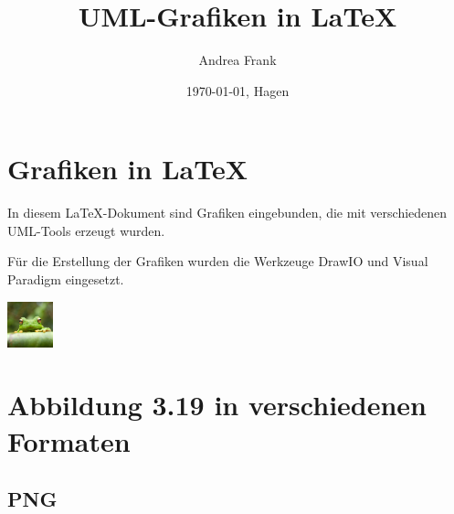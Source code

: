 \documentclass[11pt]{scrartcl}
\title{UML-Grafiken in \LaTeX}
\author{Andrea Frank}
\date{\today{}, Hagen}
\begin{document}
\maketitle

\newpage

\tableofcontents

\newpage

\section{Grafiken in \LaTeX}

In diesem \LaTeX-Dokument sind Grafiken eingebunden, die mit  verschiedenen UML-Tools erzeugt wurden.

Für die Erstellung der Grafiken wurden die Werkzeuge DrawIO und Visual Paradigm eingesetzt. 

\begin{center}
    \includegraphics[width=0.1\textwidth]{frog}
\end{center}

\newpage

\section{Abbildung 3.19 in verschiedenen Formaten}

\subsection{PNG}
\begin{figure}[htbp]
   \centering
   \setlength{\fboxsep}{5pt}
   \setlength{\fboxrule}{2pt}
   \label{fig:Abb-3-19-png}
\end{figure}
\end{document}
